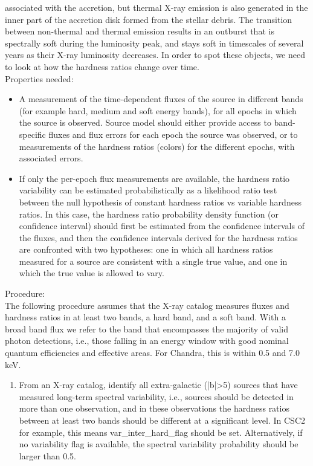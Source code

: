 \begin{enumerate}
  associated with the accretion, but thermal X-ray emission is also generated in
  the inner part of the accretion disk formed from the stellar debris. The
  transition between non-thermal and thermal emission results in an outburst
  that is spectrally soft during the luminosity peak, and stays soft in
  timescales of several years as their X-ray luminosity decreases.  In order
  to spot these objects, we need to look at how the hardness ratios change over time.\\
  Properties needed:
  \begin{itemize}
  \item A measurement of the time-dependent fluxes of the source in different bands (for example hard, medium and soft energy bands), for all epochs in which the source is observed. Source model should either provide access to band-specific fluxes and flux errors for each epoch the source was observed, or to measurements of the hardness ratios (colors) for the different epochs, with associated errors.
  \item If only the per-epoch flux measurements are available, the hardness ratio variability can be estimated probabilistically as a likelihood ratio test between the null hypothesis of constant hardness ratios vs variable hardness ratios. In this case, the hardness ratio probability density function (or confidence interval) should first be estimated from the confidence intervals of the fluxes, and then the confidence intervals derived for the hardness ratios are confronted with two hypotheses: one in which all hardness ratios measured for a source are consistent with a single true value, and one in which the true value is allowed to vary.
  \end{itemize}
  Procedure: \\
  The following procedure assumes that the X-ray catalog measures fluxes and hardness ratios in at least two bands, a hard band, and a soft band. With a broad band flux we refer to the band that encompasses the majority of valid photon detections, i.e., those falling in an energy window with good nominal quantum efficiencies and effective areas. For Chandra, this is within 0.5 and 7.0 keV.
  \begin{enumerate}
  \item From an X-ray catalog, identify all extra-galactic (|b|>5) sources that have measured long-term spectral variability, i.e., sources should be detected in more than one observation, and in these observations the hardness ratios between at least two bands should be different at a significant level. In CSC2 for example, this means var\_inter\_hard\_flag should be set. Alternatively, if no variability flag is available, the spectral variability probability should be larger than 0.5.

\end{enumerate}
\end{enumerate}
